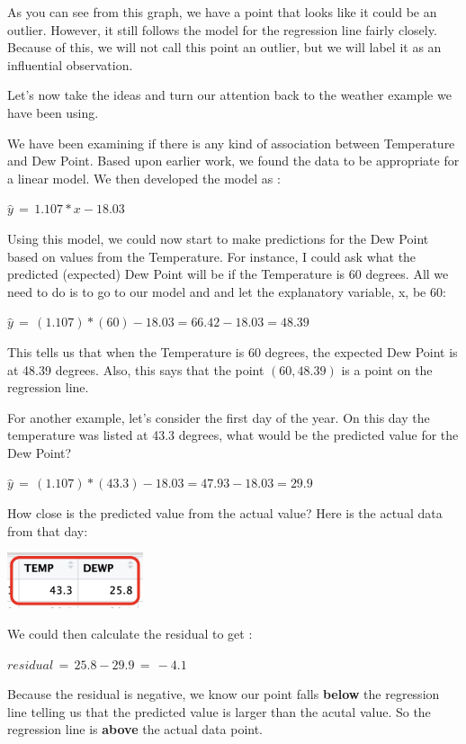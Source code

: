 \documentclass[
  letterpaper,
  DIV=11,
  numbers=noendperiod]{scrreprt}
\begin{document}
As you can see from this graph, we have a point that looks like it could
be an outlier. However, it still follows the model for the regression
line fairly closely. Because of this, we will not call this point an
outlier, but we will label it as an influential observation.

Let's now take the ideas and turn our attention back to the weather
example we have been using.

We have been examining if there is any kind of association between
Temperature and Dew Point. Based upon earlier work, we found the data to
be appropriate for a linear model. We then developed the model as :

\(\hat{y} \, = \, 1.107*x - 18.03\)

Using this model, we could now start to make predictions for the Dew
Point based on values from the Temperature. For instance, I could ask
what the predicted (expected) Dew Point will be if the Temperature is 60
degrees. All we need to do is to go to our model and and let the
explanatory variable, x, be 60:

\(\hat{y} \, = \, (1.107)*(60) - 18.03 = 66.42 - 18.03 = 48.39\)

This tells us that when the Temperature is 60 degrees, the expected Dew
Point is at 48.39 degrees. Also, this says that the point
\((60, 48.39)\) is a point on the regression line.

For another example, let's consider the first day of the year. On this
day the temperature was listed at 43.3 degrees, what would be the
predicted value for the Dew Point?

\(\hat{y} \, = \, (1.107)*(43.3) - 18.03 = 47.93 - 18.03 = 29.9\)

How close is the predicted value from the actual value? Here is the
actual data from that day:

\includegraphics[width=0.3\textwidth,height=\textheight]{./images/ROP_8.jpg}

We could then calculate the residual to get :

\(residual \, = \, 25.8 - 29.9\, = \, -4.1\)

Because the residual is negative, we know our point falls \textbf{below}
the regression line telling us that the predicted value is larger than
the acutal value. So the regression line is \textbf{above} the actual
data point.
\end{document}
